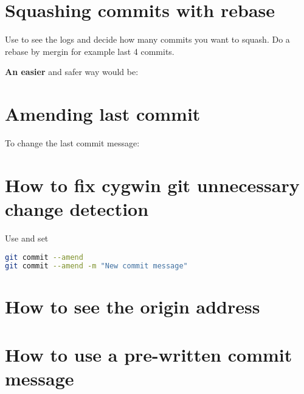 \section{Squashing commits with rebase}
Use  to see the logs and decide how many commits you want to squash. Do a rebase by mergin for example last 4 commits.



\textbf{An easier} and safer way would be:
\section{Amending last commit}

To change the last commit message:

\section{How to fix cygwin git unnecessary change detection}
Use  and set 


\begin{lstlisting}[language=sh,style=mysh]
git commit --amend
git commit --amend -m "New commit message"
\end{lstlisting}

\section{How to see the origin address}

\section{How to use a pre-written commit message}

